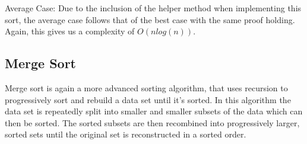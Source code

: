 \documentclass{article}
\begin{document}
\newline\newline
Average Case:
\newline
Due to the inclusion of the helper method when implementing this sort, the average case follows that of the best case with the same proof holding. Again, this gives us a complexity of \begin{math}O(nlog(n))\end{math}.









\subsection{Merge Sort}
Merge sort is again a more advanced sorting algorithm, that uses recursion to progressively sort and rebuild a data set until it's sorted. In this algorithm the data set is repeatedly split into smaller and smaller subsets of the data which can then be sorted. The sorted subsets are then recombined into progressively larger, sorted sets until the original set is reconstructed in a sorted order.
\end{document}
